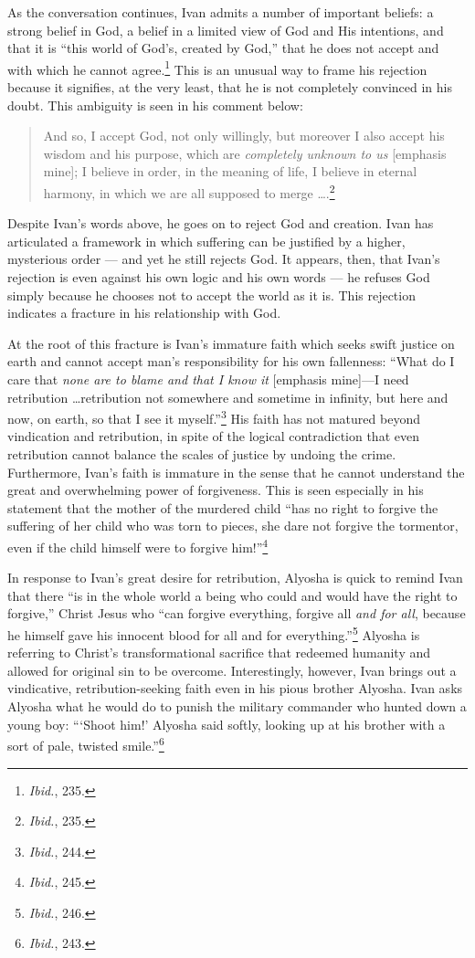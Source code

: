 As the conversation continues, Ivan admits a number of important beliefs: a strong belief in God, a belief in a limited view of God and His intentions, and that it is ``this world of God's, created by God,'' that he does not accept and with which he cannot agree.\footnote{\emph{Ibid.}, 235.} This is an unusual way to frame his rejection because it signifies, at the very least, that he is not completely convinced in his doubt. This ambiguity is seen in his comment below:

\begin{quote}
\singlespacing
And so, I accept God, not only willingly, but moreover I also accept his wisdom and his purpose, which are \emph{completely unknown to us} [emphasis mine]; I believe in order, in the meaning of life, I believe in eternal harmony, in which we are all supposed to merge \ldots.\footnote{\emph{Ibid.}, 235.}
\end{quote} 

Despite Ivan's words above, he goes on to reject God and creation. Ivan has articulated a framework in which suffering can be justified by a higher, mysterious order --- and yet he still rejects God. It appears, then, that Ivan's rejection is even against his own logic and his own words --- he refuses God simply because he chooses not to accept the world as it is. This rejection indicates a fracture in his relationship with God.

At the root of this fracture is Ivan's immature faith which seeks swift justice on earth and cannot accept man's responsibility for his own fallenness: ``What do I care that \emph{none are to blame and that I know it} [emphasis mine]---I need retribution \ldots retribution not somewhere and sometime in infinity, but here and now, on earth, so that I see it myself.''\footnote{\emph{Ibid.}, 244.} His faith has not matured beyond vindication and retribution, in spite of the logical contradiction that even retribution cannot balance the scales of justice by undoing the crime. Furthermore, Ivan's faith is immature in the sense that he cannot understand the great and overwhelming power of forgiveness. This is seen especially in his statement that the mother of the murdered child ``has no right to forgive the suffering of her child who was torn to pieces, she dare not forgive the tormentor, even if the child himself were to forgive him!''\footnote{\emph{Ibid.}, 245.}

In response to Ivan's great desire for retribution, Alyosha is quick to remind Ivan that there ``is in the whole world a being who could and would have the right to forgive,'' Christ Jesus who ``can forgive everything, forgive all \emph{and for all}, because he himself gave his innocent blood for all and for everything.''\footnote{\emph{Ibid.}, 246.} Alyosha is referring to Christ's transformational sacrifice that redeemed humanity and allowed for original sin to be overcome. Interestingly, however, Ivan brings out a vindicative, retribution-seeking faith even in his pious brother Alyosha. Ivan asks Alyosha what he would do to punish the military commander who hunted down a young boy: ``\thinspace`Shoot him!' Alyosha said softly, looking up at his brother with a sort of pale, twisted smile.''\footnote{\emph{Ibid.}, 243.} 

